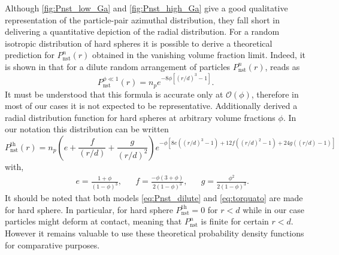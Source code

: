 Although \ref{fig:Pnst_low_Ga} and \ref{fig:Pnst_high_Ga} give a good qualitative representation of the particle-pair azimuthal distribution, they fall short in delivering a quantitative depiction of the radial distribution.
For a random isotropic distribution of hard spheres it is possible to derive a theoretical prediction for $P_\text{nst}^n(r)$ obtained in the vanishing volume fraction limit. 
Indeed, it is shown in \citet{zhang2021ensemble} that for a dilute random arrangement of particles $P_\text{nst}^n(r)$, reads as
\begin{equation}
    P_\text{nst}^{\phi \ll 1}(r) = n_p e^{- 8\phi\left[(r/d)^3-1\right]}.
    \label{eq:Pnst_dilute}
\end{equation}
It must be understood that this formula is accurate only at $\mathcal{O}(\phi)$, therefore in most of our cases it is not expected to be representative.
Additionally \citet{torquato1990nearest} derived a radial distribution function for hard spheres at arbitrary volume fractions $\phi$. 
In our notation this distribution can be written
\begin{equation}
    P_\text{nst}^\text{th}(r) = 
        n_p\left(e+\frac{f}{(r/d)} +\frac{g}{(r/d)^2}\right)
    e^{-\phi\left[8e\left((r/d)^3-1\right)+12 f\left((r/d)^2-1\right)+24g\left((r/d)-1\right)\right]}
    \label{eq:torquato}
\end{equation}
with, 
\begin{align*}
    && e= \frac{1+\phi}{(1-\phi)^3},
    && f= \frac{-\phi (3+\phi)}{2(1-\phi)^3},
    && g= \frac{\phi^2}{2(1-\phi)^3}.
\end{align*}
It should be noted that both models \eqref{eq:Pnst_dilute} and \eqref{eq:torquato} are made for hard sphere. %
In particular, for hard sphere $P_\text{nst}^\text{th} = 0$ for $r<d$ while in our case particles might deform at contact, meaning that $P_\text{nst}^n$ is finite for certain $r<d$. 
However it remains valuable to use these theoretical probability density functions for comparative purposes. 


